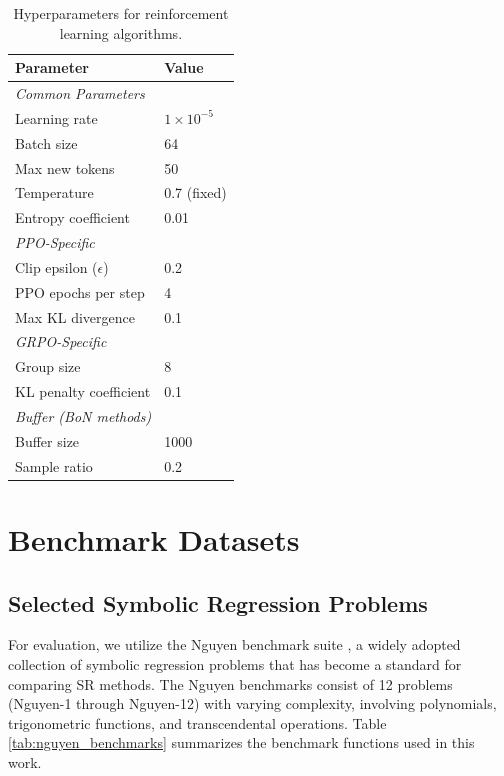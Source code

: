 \begin{table}[h!]
    \centering
    \caption{Hyperparameters for reinforcement learning algorithms.}
    \label{tab:rl_hyperparams}
    \begin{tabular}{ll}
    \toprule
    \textbf{Parameter} & \textbf{Value} \\
    \midrule
    \multicolumn{2}{l}{\textit{Common Parameters}} \\
    Learning rate & $1 \times 10^{-5}$ \\
    Batch size & 64 \\
    Max new tokens & 50 \\
    Temperature & 0.7 (fixed) \\
    Entropy coefficient & 0.01 \\
    \midrule
    \multicolumn{2}{l}{\textit{PPO-Specific}} \\
    Clip epsilon ($\epsilon$) & 0.2 \\
    PPO epochs per step & 4 \\
    Max KL divergence & 0.1 \\
    \midrule
    \multicolumn{2}{l}{\textit{GRPO-Specific}} \\
    Group size & 8 \\
    KL penalty coefficient & 0.1 \\
    \midrule
    \multicolumn{2}{l}{\textit{Buffer (BoN methods)}} \\
    Buffer size & 1000 \\
    Sample ratio & 0.2 \\
    \bottomrule
    \end{tabular}
\end{table}

    \section{Benchmark Datasets}
        \subsection{Selected Symbolic Regression Problems}
    For evaluation, we utilize the Nguyen benchmark suite \cite{uy_semantically-based_2011}, a widely adopted collection of symbolic regression problems that has become a standard for comparing SR methods. The Nguyen benchmarks consist of 12 problems (Nguyen-1 through Nguyen-12) with varying complexity, involving polynomials, trigonometric functions, and transcendental operations. Table \ref{tab:nguyen_benchmarks} summarizes the benchmark functions used in this work.

